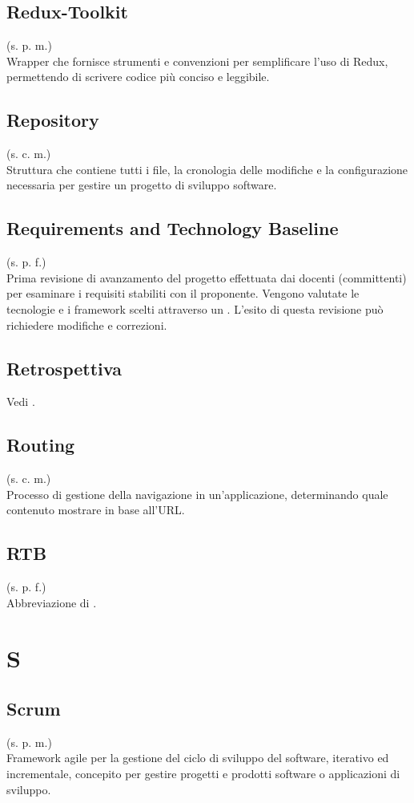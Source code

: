 \subsection{Redux-Toolkit}
(s. p. m.)\\
Wrapper che fornisce strumenti e convenzioni per semplificare l'uso di Redux,
permettendo di scrivere codice più conciso e leggibile.
\subsection{Repository}
\label{Repository}
(s. c. m.)\\
Struttura che contiene tutti i file, la cronologia delle modifiche e la
configurazione necessaria per gestire un progetto di sviluppo software.
\subsection{Requirements and Technology Baseline}
\label{Requirements and Technology Baseline}
(s. p. f.)\\
Prima revisione di avanzamento del progetto effettuata dai docenti (committenti)
per esaminare i requisiti stabiliti con il proponente. Vengono valutate le
tecnologie e i framework scelti attraverso un .
L'esito di questa revisione può richiedere modifiche e correzioni.
\subsection{Retrospettiva}
Vedi .
\subsection{Routing}
(s. c. m.)\\
Processo di gestione della navigazione in un'applicazione, determinando quale contenuto mostrare in base all'URL.
\subsection{RTB}
(s. p. f.)\\
Abbreviazione di .
\pagebreak
\section{S}
\subsection{Scrum}
(s. p. m.)\\
Framework agile per la gestione del ciclo di sviluppo del software,
iterativo ed incrementale, concepito per gestire progetti e prodotti software
o applicazioni di sviluppo.
